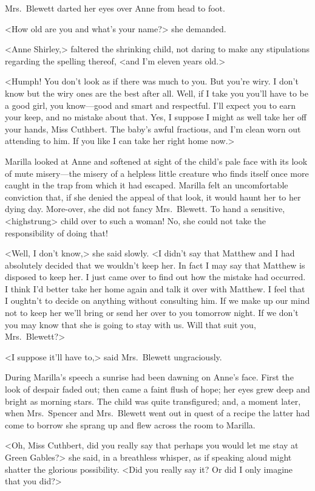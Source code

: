 Mrs.~Blewett darted her eyes over Anne from head to foot.

<How old are you and what's your name?> she demanded.

<Anne Shirley,> faltered the shrinking child, not daring to make any stipulations regarding the spelling thereof, <and I'm eleven years old.>

<Humph! You don't look as if there was much to you. But you're wiry. I don't know but the wiry ones are the best after all. Well, if I take you you'll have to be a good girl, you know—good and smart and respectful. I'll expect you to earn your keep, and no mistake about that. Yes, I suppose I might as well take her off your hands, Miss Cuthbert. The baby's awful fractious, and I'm clean worn out attending to him. If you like I can take her right home now.>

Marilla looked at Anne and softened at sight of the child's pale face with its look of mute misery—the misery of a helpless little creature who finds itself once more caught in the trap from which it had escaped. Marilla felt an uncomfortable conviction that, if she denied the appeal of that look, it would haunt her to her dying day. More-over, she did not fancy Mrs.~Blewett. To hand a sensitive, <highstrung> child over to such a woman! No, she could not take the responsibility of doing that!

<Well, I don't know,> she said slowly. <I didn't say that Matthew and I had absolutely decided that we wouldn't keep her. In fact I may say that Matthew is disposed to keep her. I just came over to find out how the mistake had occurred. I think I'd better take her home again and talk it over with Matthew. I feel that I oughtn't to decide on anything without consulting him. If we make up our mind not to keep her we'll bring or send her over to you tomorrow night. If we don't you may know that she is going to stay with us. Will that suit you, Mrs.~Blewett?>

<I suppose it'll have to,> said Mrs.~Blewett ungraciously.

During Marilla's speech a sunrise had been dawning on Anne's face. First the look of despair faded out; then came a faint flush of hope; her eyes grew deep and bright as morning stars. The child was quite transfigured; and, a moment later, when Mrs.~Spencer and Mrs.~Blewett went out in quest of a recipe the latter had come to borrow she sprang up and flew across the room to Marilla.

<Oh, Miss Cuthbert, did you really say that perhaps you would let me stay at Green Gables?> she said, in a breathless whisper, as if speaking aloud might shatter the glorious possibility. <Did you really say it? Or did I only imagine that you did?>

